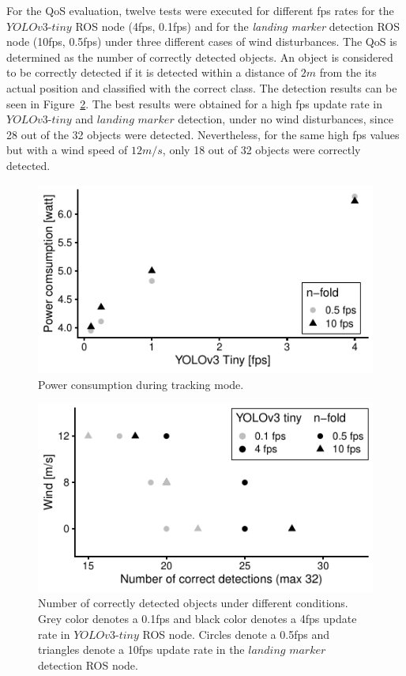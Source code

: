 \documentclass[conference]{IEEEtran}
\begin{document}
For the QoS evaluation, twelve tests were executed for different 
fps rates for the $YOLOv3$-$tiny$ ROS node (4fps, 0.1fps) and for 
the \emph{landing marker} detection ROS node (10fps, 0.5fps) under 
three different cases of wind disturbances. 
%
The QoS is determined as the number of correctly detected objects. An
object is considered to be correctly detected if it is detected within
a distance of $2m$ from the its actual position and classified with
the correct class. The detection results can be seen in
Figure~\ref{fig:NCorrectObjectDetections}. The best results were
obtained for a high fps update rate in $YOLOv3$-$tiny$ and $landing$
$marker$ detection, under no wind disturbances, since 28 out of the 32
objects were detected. Nevertheless, for the same high fps values but
with a wind speed of $12 m/s$, only 18 out of 32 objects were
correctly detected.



\begin{figure}[h]
\centering
\includegraphics{data_visualization/PowerDetection.pdf}
\caption{Power consumption during tracking mode.}
\label{fig:PowerDuringTracking}
\end{figure}

\begin{figure}[h]
\centering
\includegraphics{data_visualization/QoSDetection.pdf}
\caption{Number of correctly detected objects
under different conditions. 
Grey color denotes a 0.1fps and black color denotes a 4fps 
update rate in $YOLOv3$-$tiny$ ROS node. 
Circles denote a 0.5fps and triangles denote a 10fps update 
rate in the $landing$ $marker$ detection ROS node.}
\label{fig:NCorrectObjectDetections}
\end{figure}
\end{document}
